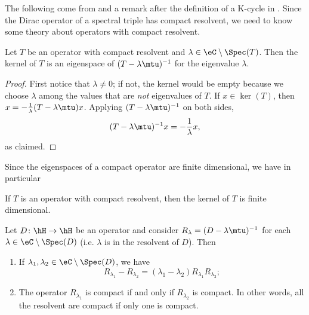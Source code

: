 The following come from \cite{Whittaker} and a remark after the definition of a K-cycle in \cite{itoNCG_Varilly}. Since the Dirac operator of a spectral triple has compact resolvent, we need to know some theory about operators with compact resolvent.

\begin{lemma}		\label{LemResComKerFin}
	Let $T$ be an operator with compact resolvent and $\lambda\in\eC\setminus\Spec(T)$. Then the kernel of $T$ is an eigenspace of $(T-\lambda\mtu)^{-1}$ for the eigenvalue $\lambda$.
\end{lemma}

\begin{proof}
	First notice that $\lambda\neq 0$; if not, the kernel would be empty because we choose $\lambda$ among the values that are \emph{not} eigenvalues of $T$. If $x\in\ker(T)$, then $x=-\frac{1}{ \lambda }(T-\lambda\mtu)x$. Applying $(T-\lambda\mtu)^{-1}$ on both sides,
	\begin{equation}
		(T-\lambda\mtu)^{-1}x=-\frac{1}{ \lambda }x,
	\end{equation}
	as claimed.
\end{proof}

Since the eigenspaces of a compact operator are finite dimensional, we have in particular
\begin{corollary}		\label{CorRezcomkerfin}
	If $T$ is an operator with compact resolvent, then the kernel of $T$ is finite dimensional.
\end{corollary}

\begin{lemma}		\label{LemResLcmpResLLcmp}
	Let $D\colon \hH\to \hH$ be an operator and consider $R_{\lambda}=(D-\lambda\mtu)^{-1}$ for each $\lambda\in\eC\setminus\Spec(D)$ (i.e. $\lambda$ is in the resolvent of $D$). Then
	\begin{enumerate}
		\item
			If $\lambda_1,\lambda_2\in\eC\setminus\Spec(D)$, we have
			\begin{equation}
				R_{\lambda_1}-R_{\lambda_2}=(\lambda_1-\lambda_2)R_{\lambda_1}R_{\lambda_2};
			\end{equation}
		\item
			The operator $R_{\lambda_1}$ is compact if and only if $R_{\lambda_2}$ is compact. In other words, all the resolvent are compact if only one is compact.
	\end{enumerate}
\end{lemma}

